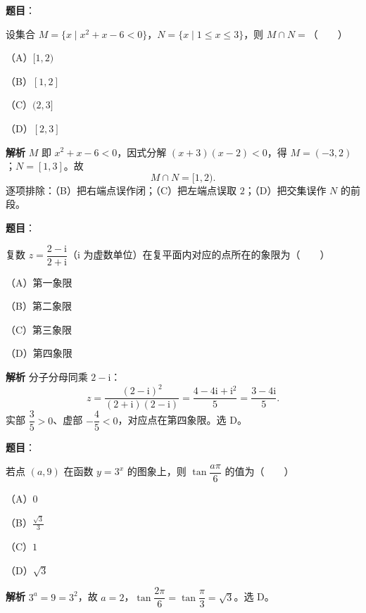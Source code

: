 
\begin{answer}

\textbf{题目}：

设集合 $M=\{x\mid x^2+x-6<0\}$，$N=\{x\mid 1\leqslant x\leqslant 3\}$，则 $M\cap N=$\mbox{（　　）}

（A）$[1,2)$

（B）$[1,2]$

（C）$(2,3]$

（D）$[2,3]$

\textbf{解析}
$M$ 即 $x^2+x-6<0$，因式分解 $(x+3)(x-2)<0$，得 $M=(-3,2)$；$N=[1,3]$。故
\nopagebreak[4]
\[M\cap N=[1,2).\]
逐项排除：（B）把右端点误作闭；（C）把左端点误取 $2$；（D）把交集误作 $N$ 的前段。


\end{answer}
\begin{answer}

\textbf{题目}：

复数 $z=\dfrac{2-\mathrm i}{2+\mathrm i}$（$\mathrm i$ 为虚数单位）在复平面内对应的点所在的象限为\mbox{（　　）}

（A）第一象限

（B）第二象限

（C）第三象限

（D）第四象限

\textbf{解析}
分子分母同乘 $2-\mathrm i$：
\nopagebreak[4]
\[z=\frac{(2-\mathrm i)^2}{(2+\mathrm i)(2-\mathrm i)}=\frac{4-4\mathrm i+\mathrm i^2}{5}=\frac{3-4\mathrm i}{5}.\]
实部 $\dfrac35>0$、虚部 $-\dfrac45<0$，对应点在第四象限。选 D。


\end{answer}
\begin{answer}

\textbf{题目}：

若点 $(a,9)$ 在函数 $y=3^x$ 的图象上，则 $\tan\dfrac{a\pi}{6}$ 的值为\mbox{（　　）}

（A）$0$

（B）$\frac{\sqrt3}{3}$

（C）$1$

（D）$\sqrt3$

\textbf{解析}
$3^a=9=3^2$，故 $a=2$，$\tan\dfrac{2\pi}{6}=\tan\dfrac\pi3=\sqrt3$。选 D。


\end{answer}
